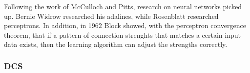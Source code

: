 \documentclass[../main.tex]{subfiles}
\begin{document}
Following the work of McCulloch and Pitts, research on neural networks picked up. Bernie Widrow researched his adalines\cite{widrowAssociativeStorageRetrieval1962}, while Rosenblatt researched perceptrons. In addition, in 1962 Block showed, with the perceptron convergence theorem, that if a pattern of connection strenghts that matches a certain input data exists, then the learning algorithm can adjust the strengths correctly\cite{russellArtificialIntelligenceModern2002}.

\subsubsection{DCS}
\end{document}
